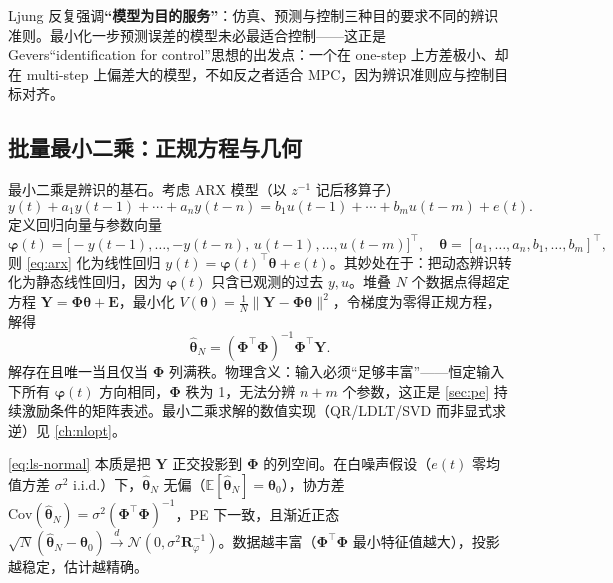 Ljung 反复强调\textbf{“模型为目的服务”}：仿真、预测与控制三种目的要求不同的辨识准则。最小化一步预测误差的模型未必最适合控制——这正是 Gevers“identification for control”思想的出发点：一个在 one-step 上方差极小、却在 multi-step 上偏差大的模型，不如反之者适合 MPC，因为辨识准则应与控制目标对齐。

\subsection{批量最小二乘：正规方程与几何}
最小二乘是辨识的基石。考虑 ARX 模型（以 $z^{-1}$ 记后移算子）
\begin{equation}
  y(t)+a_1 y(t-1)+\cdots+a_n y(t-n)=b_1 u(t-1)+\cdots+b_m u(t-m)+e(t).
  \label{eq:arx}
\end{equation}
定义回归向量与参数向量
\begin{equation}
  \boldsymbol\varphi(t)=\big[-y(t-1),\dots,-y(t-n),\,u(t-1),\dots,u(t-m)\big]^\top,\quad
  \boldsymbol\theta=[a_1,\dots,a_n,b_1,\dots,b_m]^\top,
\end{equation}
则 \cref{eq:arx} 化为线性回归 $y(t)=\boldsymbol\varphi(t)^\top\boldsymbol\theta+e(t)$。其妙处在于：把动态辨识转化为静态线性回归，因为 $\boldsymbol\varphi(t)$ 只含已观测的过去 $y,u$。堆叠 $N$ 个数据点得超定方程 $\mathbf Y=\boldsymbol\Phi\boldsymbol\theta+\mathbf E$，最小化 $V(\boldsymbol\theta)=\tfrac1N\|\mathbf Y-\boldsymbol\Phi\boldsymbol\theta\|^2$，令梯度为零得正规方程，解得
\begin{equation}
  \hat{\boldsymbol\theta}_N=(\boldsymbol\Phi^\top\boldsymbol\Phi)^{-1}\boldsymbol\Phi^\top\mathbf Y.
  \label{eq:ls-normal}
\end{equation}
解存在且唯一当且仅当 $\boldsymbol\Phi$ 列满秩。物理含义：输入必须“足够丰富”——恒定输入下所有 $\boldsymbol\varphi(t)$ 方向相同，$\boldsymbol\Phi$ 秩为 1，无法分辨 $n+m$ 个参数，这正是 \cref{sec:pe} 持续激励条件的矩阵表述。最小二乘求解的数值实现（QR/LDLT/SVD 而非显式求逆）见 \cref{ch:nlopt}。

\begin{insight}
\cref{eq:ls-normal} 本质是把 $\mathbf Y$ 正交投影到 $\boldsymbol\Phi$ 的列空间。在白噪声假设（$e(t)$ 零均值方差 $\sigma^2$ i.i.d.）下，$\hat{\boldsymbol\theta}_N$ 无偏（$\mathbb E[\hat{\boldsymbol\theta}_N]=\boldsymbol\theta_0$），协方差 $\mathrm{Cov}(\hat{\boldsymbol\theta}_N)=\sigma^2(\boldsymbol\Phi^\top\boldsymbol\Phi)^{-1}$，PE 下一致，且渐近正态 $\sqrt N(\hat{\boldsymbol\theta}_N-\boldsymbol\theta_0)\xrightarrow{d}\mathcal N(0,\sigma^2\mathbf R_\varphi^{-1})$。数据越丰富（$\boldsymbol\Phi^\top\boldsymbol\Phi$ 最小特征值越大），投影越稳定，估计越精确。
\end{insight}

